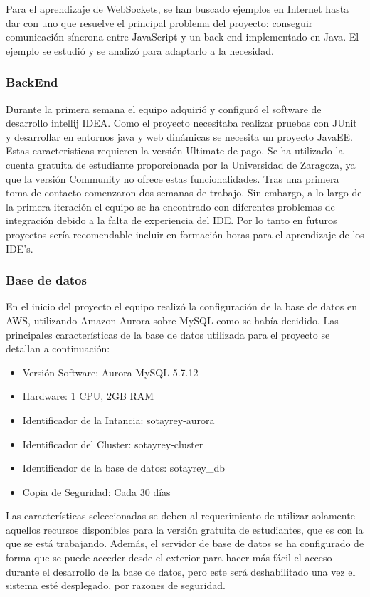 Para el aprendizaje de WebSockets, se han buscado ejemplos en Internet hasta dar con uno que resuelve el principal problema del proyecto: conseguir comunicación síncrona entre JavaScript y un back-end implementado en Java. El ejemplo se estudió y se analizó para adaptarlo a la necesidad.


\subsubsection*{BackEnd}
Durante la primera semana el equipo adquirió y configuró el software de desarrollo intellij IDEA. Como el proyecto necesitaba realizar pruebas con JUnit y desarrollar en entornos java y web dinámicas se necesita un proyecto JavaEE. Estas caracteristicas requieren la versión Ultimate de pago. Se ha utilizado la cuenta gratuita de estudiante proporcionada por la Universidad de Zaragoza, ya que la versión Community no ofrece estas funcionalidades.
Tras una primera toma de contacto comenzaron dos semanas de trabajo. Sin embargo, a lo largo de la primera iteración el equipo se ha encontrado con diferentes problemas de integración debido a la falta de experiencia del IDE. Por lo tanto en futuros proyectos sería recomendable incluir en formación horas para el aprendizaje de los IDE's.

\subsubsection*{Base de datos}
En el inicio del proyecto el equipo realizó la configuración de la base de datos en AWS, utilizando Amazon Aurora sobre MySQL como se había decidido. Las principales características de la base de datos utilizada para el proyecto se detallan a continuación:

\begin{itemize}
	\item Versión Software: Aurora MySQL 5.7.12
	\item Hardware: 1 CPU, 2GB RAM
	\item Identificador de la Intancia: sotayrey-aurora
	\item Identificador del Cluster: sotayrey-cluster
	\item Identificador de la base de datos: sotayrey\_db
	\item Copia de Seguridad: Cada 30 días
\end{itemize}

Las características seleccionadas se deben al requerimiento de utilizar solamente aquellos recursos disponibles para la versión gratuita de estudiantes, que es con la que se está trabajando. Además, el servidor de base de datos se ha configurado de forma que se puede acceder desde el exterior para hacer más fácil el acceso durante el desarrollo de la base de datos, pero este será deshabilitado una vez el sistema esté desplegado, por razones de seguridad.\\

